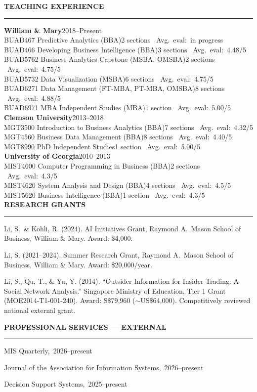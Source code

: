 \documentclass[11pt, letterpaper]{article}
\newcommand{\cvsection}[1]{%
  \vspace{14pt}%
  {\large\bfseries\color{headcolor}\MakeUppercase{#1}}%
  \vspace{2pt}\hrule\vspace{6pt}%
}
\newcommand{\cvsubsection}[2]{%
  \vspace{4pt}%
  {\bfseries #1}\hfill{\small #2}\\[-2pt]%
}
\newcommand{\cvsubblock}[1]{%
  \vspace{7pt}%
  \noindent{\bfseries #1}\par\nobreak%
}
\newcommand{\course}[3]{%
  \hspace{1.5em}#1\hfill{\small #2 \textbar\ Avg.\ eval:\ #3}\\[1pt]%
}
\begin{document}
\cvsection{Teaching Experience}

\cvsubsection{William \& Mary}{2018--Present}
\course{BUAD467 Predictive Analytics (BBA)}{2 sections}{in progress}
\course{BUAD466 Developing Business Intelligence (BBA)}{3 sections}{4.48/5}
\course{BUAD5762 Business Analytics Capstone (MSBA, OMSBA)}{2 sections}{4.75/5}
\course{BUAD5732 Data Visualization (MSBA)}{6 sections}{4.75/5}
\course{BUAD6271 Data Management (FT-MBA, PT-MBA, OMSBA)}{8 sections}{4.88/5}
\course{BUAD6971 MBA Independent Studies (MBA)}{1 section}{5.00/5}

\vspace{4pt}
\cvsubsection{Clemson University}{2013--2018}
\course{MGT3500 Introduction to Business Analytics (BBA)}{7 sections}{4.32/5}
\course{MGT4560 Business Data Management (BBA)}{8 sections}{4.40/5}
\course{MGT8990 PhD Independent Studies}{1 section}{5.00/5}

\vspace{4pt}
\cvsubsection{University of Georgia}{2010--2013}
\course{MIST4600 Computer Programming in Business (BBA)}{2 sections}{4.3/5}
\course{MIST4620 System Analysis and Design (BBA)}{4 sections}{4.5/5}
\course{MIST5620 Business Intelligence (BBA)}{1 section}{4.3/5}

\cvsection{Research Grants}

\begin{publist}
  \item Li, S.\ \& Kohli, R. (2024). AI Initiatives Grant, Raymond A.\ Mason School of Business, William \& Mary. Award: \$4,000.

  \item Li, S. (2021--2024). Summer Research Grant, Raymond A.\ Mason School of Business, William \& Mary. Award: \$20,000/year.

  \item Li, S., Qu, T., \& Yu, Y. (2014). ``Outsider Information for Insider Trading: A Social Network Analysis.'' Singapore Ministry of Education, Tier 1 Grant (MOE2014-T1-001-240). Award: S\$79,960 (${\sim}$US\$64,000). Competitively reviewed national external grant.
\end{publist}

\cvsection{Professional Services --- External}

\cvsubblock{Associate Editor}
\begin{cvlist}
  \item MIS Quarterly,~2026--present
  \item Journal of the Association for Information Systems,~2026--present
  \item Decision Support Systems,~2025--present
\end{cvlist}
\end{document}
